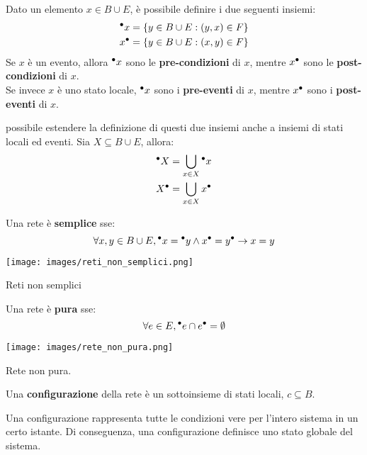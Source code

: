 \begin{defn}
    Dato un elemento $x \in B \cup E$, è possibile definire i due seguenti insiemi:
    \begin{align*}
        {^\bullet}x &= \left\{y \in B \cup E : (y, x) \in F\right\}\\
        x^\bullet &= \left\{y \in B \cup E : (x, y) \in F\right\}
    \end{align*}
    Se $x$ è un evento, allora ${^\bullet}x$ sono le \textbf{pre-condizioni} di $x$, mentre $x^\bullet$ sono le \textbf{post-condizioni} di $x$.\\
    Se invece $x$ è uno stato locale, ${^\bullet}x$ sono i \textbf{pre-eventi} di $x$, mentre $x^\bullet$ sono i \textbf{post-eventi} di $x$.
    
    \upperAccE possibile estendere la definizione di questi due insiemi anche a insiemi di stati locali ed eventi. Sia $X \subseteq B \cup E$, allora:
    \begin{align*}
        {^\bullet}X &= \bigcup\limits_{x \in X} {^\bullet}x\\
        X^\bullet &= \bigcup\limits_{x \in X} x^\bullet
    \end{align*}
\end{defn}

\begin{defn}
    Una rete è \textbf{semplice} sse:
    \[
        \forall x, y \in B \cup E, {^\bullet}x = {^\bullet}y \land x^\bullet = y^\bullet \rightarrow x = y
    \]
    \begin{marginfigure}[-5cm]
        \texttt{[image: images/reti\_non\_semplici.png]}
        \caption{Reti non semplici}
        \label{fig:reti_non_semplici}
    \end{marginfigure}
\end{defn}

\begin{defn}
    Una rete è \textbf{pura} sse:
    \[
        \forall e \in E, {^\bullet}e \cap e^\bullet = \emptyset
    \]
    \begin{marginfigure}[-1cm]
        \texttt{[image: images/rete\_non\_pura.png]}
        \caption{Rete non pura.}
        \label{fig:rete_non_pura}
    \end{marginfigure}
\end{defn}

\begin{defn}
    Una \textbf{configurazione} della rete è un sottoinsieme di stati locali, $c \subseteq B$.

    Una configurazione rappresenta tutte le condizioni vere per l'intero sistema in un certo istante. Di conseguenza, una configurazione definisce uno stato globale del sistema.
\end{defn}

